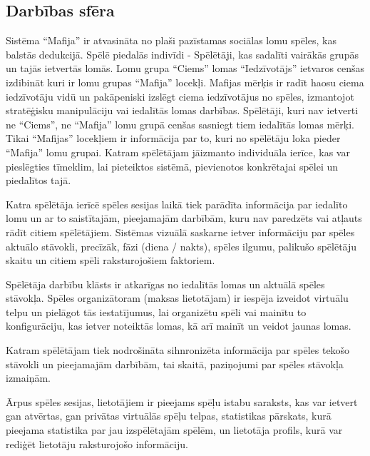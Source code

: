 \subsection*{Darbības sfēra}

Sistēma ``Mafija'' ir atvasināta no plaši pazīstamas sociālas lomu spēles, kas
balstās dedukcijā. Spēlē piedalās indivīdi - Spēlētāji, kas sadalīti vairākās
grupās un tajās ietvertās lomās. Lomu grupa ``Ciems'' lomas ``Iedzīvotājs''
ietvaros cenšas izdibināt kuri ir lomu grupas ``Mafija'' locekļi. Mafijas mērķis
ir radīt haosu ciema iedzīvotāju vidū un pakāpeniski izslēgt ciema iedzīvotājus
no spēles, izmantojot stratēģisku manipulāciju vai iedalītās lomas darbības.
Spēlētāji, kuri nav ietverti ne ``Ciems'', ne ``Mafija'' lomu grupā cenšas sasniegt
tiem iedalītās lomas mērķi. Tikai ``Mafijas'' locekļiem ir informācija par to,
kuri no spēlētāju loka pieder ``Mafija'' lomu grupai. Katram spēlētājam jāizmanto
individuāla ierīce, kas var pieslēgties tīmeklim, lai pieteiktos sistēmā,
pievienotos konkrētajai spēlei un piedalītos tajā.

Katra spēlētāja ierīcē spēles sesijas laikā tiek parādīta informācija par
iedalīto lomu un ar to saistītajām, pieejamajām darbībām, kuru nav paredzēts
vai atļauts rādīt citiem spēlētājiem. Sistēmas vizuālā saskarne ietver
informāciju par spēles aktuālo stāvokli, precīzāk, fāzi (diena / nakts), spēles
ilgumu, palikušo spēlētāju skaitu un citiem spēli raksturojošiem faktoriem.

Spēlētāja darbību klāsts ir atkarīgas no iedalītās lomas un aktuālā spēles
stāvokļa. Spēles organizātoram (maksas lietotājam) ir iespēja izveidot virtuālu
telpu un pielāgot tās iestatījumus, lai organizētu spēli vai mainītu to
konfigurāciju, kas ietver noteiktās lomas, kā arī mainīt un veidot jaunas
lomas.

Katram spēlētājam tiek nodrošināta sihnronizēta informācija par spēles tekošo
stāvokli un pieejamajām darbībām, tai skaitā, paziņojumi par spēles stāvokļa
izmaiņām.

Ārpus spēles sesijas, lietotājiem ir pieejams spēļu istabu saraksts, kas var
ietvert gan atvērtas, gan privātas virtuālās spēļu telpas, statistikas
pārskats, kurā pieejama statistika par jau izspēlētajām spēlēm, un lietotāja
profils, kurā var rediģēt lietotāju raksturojošo informāciju.

